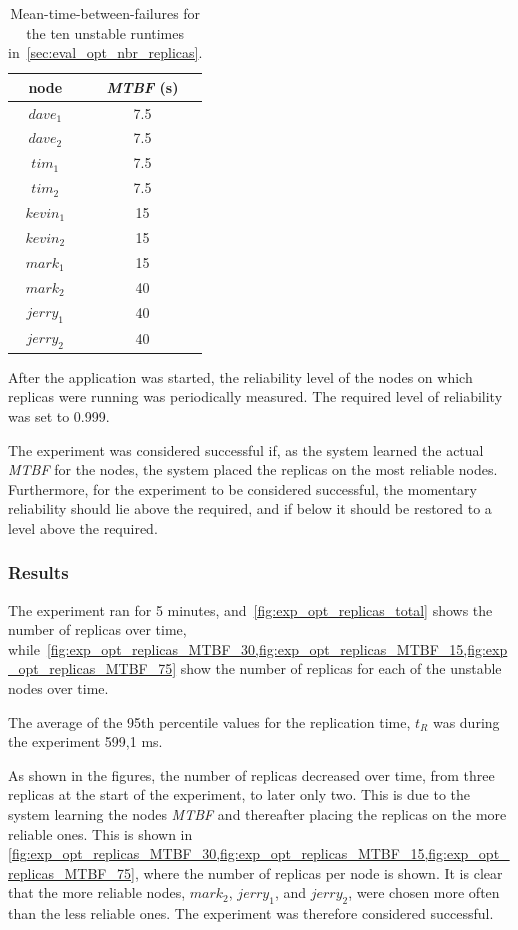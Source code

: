 \documentclass{cslthse-msc}
\begin{document}
\begin{table}[h]
	\begin{center}
	\begin{tabular}{| c | c |}
	 \hline
	 node & \emph{MTBF} (s) \\
	 \hline		
	  $dave_1$ & 7.5 \\
	  $dave_2$ & 7.5 \\
	  $tim_1$ & 7.5 \\
	  $tim_2$ & 7.5 \\
	  $kevin_1$ & 15 \\
	  $kevin_2$ & 15 \\
	  $mark_1$ & 15 \\
	  $mark_2$ & 40 \\
	  $jerry_1$ & 40 \\
	  $jerry_2$ & 40 \\
	   \hline
	\end{tabular}
	 \caption[\emph{MTBF} for nodes in~\cref{sec:eval_opt_nbr_replicas}]{Mean-time-between-failures for the ten unstable runtimes in~\cref{sec:eval_opt_nbr_replicas}.}
	 \label{table:exp_nodes_means}
	 \end{center}
 \end{table}

After the application was started, the reliability level of the nodes on which replicas were running was periodically measured. The required level of reliability was set to 0.999.

The experiment was considered successful if, as the system learned the actual \emph{MTBF} for the nodes, the system placed the replicas on the most reliable nodes. Furthermore, for the experiment to be considered successful, the momentary reliability should lie above the required, and if below it should be restored to a level above the required.

\subsubsection*{Results}
The experiment ran for 5 minutes, and~\cref{fig:exp_opt_replicas_total} shows the number of replicas over time, while~\cref{fig:exp_opt_replicas_MTBF_30,fig:exp_opt_replicas_MTBF_15,fig:exp_opt_replicas_MTBF_75} show the number of replicas for each of the unstable nodes over time.

The average of the 95th percentile values for the replication time, $t_R$ was during the experiment 599,1 ms.

As shown in the figures, the number of replicas decreased over time, from three replicas at the start of the experiment, to later only two. This is due to the system learning the nodes \emph{MTBF} and thereafter placing the replicas on the more reliable ones. This is shown in \cref{fig:exp_opt_replicas_MTBF_30,fig:exp_opt_replicas_MTBF_15,fig:exp_opt_replicas_MTBF_75}, where the number of replicas per node is shown. It is clear that the more reliable nodes, $mark_2$, $jerry_1$, and $jerry_2$, were chosen more often than the less reliable ones. The experiment was therefore considered successful.
\end{document}
